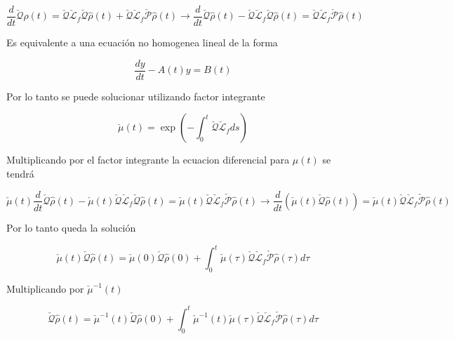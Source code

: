 \begin{appendixs}
\begin{equation*}
    \frac{d}{dt}\check{\mathcal{Q}}\hat{\rho}(t) = \check{\mathcal{Q}}\check{\mathcal{L}}_{f}\check{\mathcal{Q}}\hat{\rho}(t) + \check{\mathcal{Q}}\check{\mathcal{L}}_{f}\check{\mathcal{P}}\hat{\rho}(t) \to \frac{d}{dt}\check{\mathcal{Q}}\hat{\rho}(t) - \check{\mathcal{Q}}\check{\mathcal{L}}_{f}\check{\mathcal{Q}}\hat{\rho}(t) = \check{\mathcal{Q}}\check{\mathcal{L}}_{f}\check{\mathcal{P}}\hat{\rho}(t)
\end{equation*}

Es equivalente a una ecuación no homogenea lineal de la forma

\begin{equation*}
    \frac{dy}{dt} - A(t)y = B(t)
\end{equation*}

Por lo tanto se puede solucionar utilizando factor integrante

\begin{equation*}
    \check{\mu}(t) = \exp\left( - \int_{0}^{t}\check{\mathcal{Q}}\check{\mathcal{L}}_{f}ds \right)
\end{equation*}

Multiplicando por el factor integrante la ecuacion diferencial para $\mu(t)$ se tendrá

\begin{equation*}
    \check{\mu}(t)\frac{d}{dt}\check{\mathcal{Q}}\hat{\rho}(t) - \check{\mu}(t)\check{\mathcal{Q}}\check{\mathcal{L}}_{f}\check{\mathcal{Q}}\hat{\rho}(t) = \check{\mu}(t)\check{\mathcal{Q}}\check{\mathcal{L}}_{f}\check{\mathcal{P}}\hat{\rho}(t) \to \frac{d}{dt}(\check{\mu}(t)\check{\mathcal{Q}}\hat{\rho}(t)) = \check{\mu}(t)\check{\mathcal{Q}}\check{\mathcal{L}}_{f}\check{\mathcal{P}}\hat{\rho}(t) 
\end{equation*}

Por lo tanto queda la solución

\begin{equation*}
    \check{\mu}(t)\check{\mathcal{Q}}\hat{\rho}(t) = \check{\mu}(0)\check{\mathcal{Q}}\hat{\rho}(0) + \int_{0}^{t}\check{\mu}(\tau)\check{\mathcal{Q}}\check{\mathcal{L}}_{f} \check{\mathcal{P}}\hat{\rho}(\tau)d\tau    
\end{equation*}

Multiplicando por $\check{\mu}^{-1}(t)$ 

\begin{equation*}
    \check{\mathcal{Q}}\hat{\rho}(t) = \check{\mu}^{-1}(t)\check{\mathcal{Q}}\hat{\rho}(0) + \int_{0}^{t}\check{\mu}^{-1}(t)\check{\mu}(\tau)\check{\mathcal{Q}}\check{\mathcal{L}}_{f} \check{\mathcal{P}}\hat{\rho}(\tau)d\tau    
\end{equation*}


\end{appendixs}
